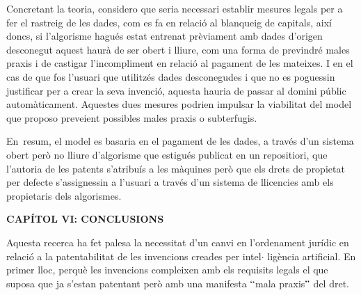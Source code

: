 \documentclass[12pt]{article}
\begin{document}
\vspace{\baselineskip}
\begin{justify}
Concretant la teoria, considero que seria necessari establir mesures legals per a fer el rastreig de les dades, com es fa en relació al blanqueig de capitals, així doncs, si l’algorisme hagués estat entrenat prèviament amb dades d’origen desconegut aquest haurà de ser obert i lliure, com una forma de previndré males praxis i de castigar l’incompliment en relació al pagament de les mateixes. I en el cas de que fos l’usuari que utilitzés dades desconegudes i que no es poguessin justificar per a crear la seva invenció, aquesta hauria de passar al domini públic automàticament. Aquestes dues mesures podrien impulsar la viabilitat del model que proposo preveient possibles males praxis o subterfugis. 
\end{justify}\par


\vspace{\baselineskip}
\begin{justify}
En\ resum, el model es basaria en el pagament de les dades, a través d’un sistema obert però no lliure d’algorisme que estigués publicat en un repositiori, que l’autoria de les patents  s’atribuís a les màquines però que els drets de propietat per defecte s’assignessin a l’usuari a través d’un sistema de llicencies amb els propietaris dels algorismes. 
\end{justify}\par


\vspace{\baselineskip}

\vspace{\baselineskip}
\begin{Center}
{\fontsize{16pt}{19.2pt}\selectfont \textbf{CAPÍTOL VI: CONCLUSIONS}\par}
\end{Center}\par


\vspace{\baselineskip}
\begin{justify}
Aquesta recerca ha fet palesa la necessitat d’un canvi en l’ordenament jurídic en relació a la patentabilitat de les invencions creades per intel$ \cdot $ ligència artificial. En primer lloc, perquè les invencions compleixen amb els requisits legals el que suposa que ja s’estan patentant però amb una manifesta $``$mala praxis$"$  del dret. 
\end{justify}\par
\end{document}
